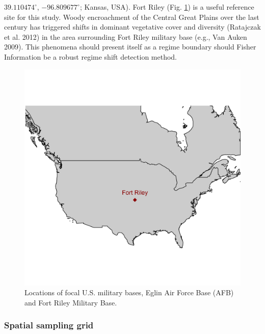 \documentclass[12pt,twoside,openany]{reedthesis}
\begin{document}
\(39.110474^{\circ}\), \(-96.809677^{\circ}\); Kansas, USA). Fort Riley
(Fig. \ref{fig:basesOfInterestMap}) is a useful reference site for this
study. Woody encroachment of the Central Great Plains over the last
century has triggered shifts in dominant vegetative cover and diversity
(Ratajczak et al. 2012) in the area surrounding Fort Riley military base
(e.g., Van Auken 2009). This phenomena should present itself as a regime
boundary should Fisher Information be a robust regime shift detection
method.
\begin{figure}

{\centering \includegraphics[width=0.85\linewidth]{./chapterFiles/fisherSpatial/figures/figsCalledInDiss/basesOfInterestMap} 

}

\caption{Locations of focal U.S. military bases, Eglin Air Force Base (AFB) and Fort Riley Military Base.}\label{fig:basesOfInterestMap}
\end{figure}
\subsubsection{Spatial sampling grid}\label{spatial-sampling-grid}
\end{document}
